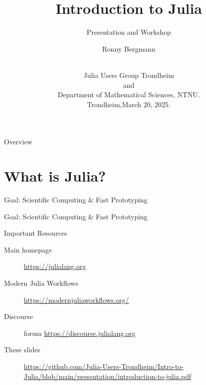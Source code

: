 \documentclass[aspectratio=169, handout]{beamer}
\title{Introduction to Julia}
\subtitle{Presentation and Workshop}
\author[Ronny Bergmann]{\large{Ronny Bergmann}\\[\baselineskip]\ }
\date[March 20, 2025]{Julia Users Group Trondheim\\[-.1\baselineskip]{\footnotesize and}\\[-.1\baselineskip]
    Department of Mathematical Sciences, NTNU.\\[\baselineskip]
    Trondheim,\hfill March 20, 2025.}
\begin{document}
	\maketitle
    \begin{frame}{Overview}
        \tableofcontents
    \end{frame}
    \section{What is Julia?}
    \begin{frame}{Goal: Scientific Computing \& Fast Prototyping}
    \end{frame}
    \begin{frame}{Goal: Scientific Computing \& Fast Prototyping}
    \end{frame}
    \begin{frame}{Important Resources}
        \begin{description}
            \item[Main homepage] \url{https://julialang.org}
            \item[Modern Julia Workflows] \url{https://modernjuliaworkflows.org/}
            \item[Discourse] forum \url{https://discourse.julialang.org}
            \item[These slides] \url{https://github.com/Julia-Users-Trondheim/Intro-to-Julia/blob/main/presentation/introduction-to-julia.pdf}
        \end{description}
    \end{frame}
\end{document}
